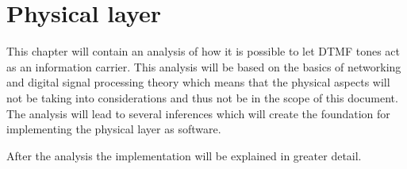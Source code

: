 \chapter{Physical layer}
This chapter will contain an analysis of how it is possible to let DTMF tones
act as an information carrier. This analysis will be based on the basics of
networking and digital signal processing theory which means that the physical
aspects will not be taking into considerations and thus not be in the scope of
this document. The analysis will lead to several inferences which will create
the foundation for implementing the physical layer as software.

After the analysis the implementation will be explained in greater detail.

